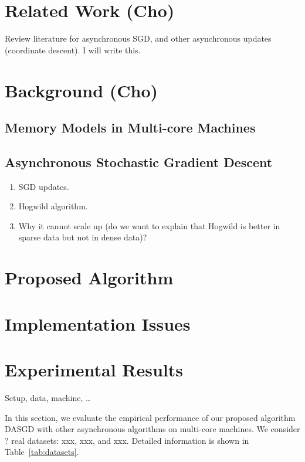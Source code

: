 \documentclass{sig-alternate-2013}
\newcommand{\0}{\boldsymbol{0}}
\def\DASGD{{DASGD}\xspace}
\begin{document}
\section{Related Work (Cho)}
\label{sec:related}
Review literature for asynchronous SGD, and other asynchronous updates (coordinate descent). 
I will write this. 

\section{Background (Cho)}
\label{sec:background}
\subsection{Memory Models in Multi-core Machines}

\subsection{Asynchronous Stochastic Gradient Descent}
\begin{enumerate}
  \item SGD updates. 
  \item Hogwild algorithm. 
  \item Why it cannot scale up (do we want to explain that Hogwild is better in sparse data but not in dense data)? 
\end{enumerate}

\section{Proposed Algorithm}
\label{sec:proposed}


\section{Implementation Issues}
\label{sec:implement}

\section{Experimental Results}
\label{sec:exp}

Setup, data, machine, \dots

In this section, we evaluate the empirical performance of our proposed
algorithm \DASGD with other asynchronous algorithms on multi-core machines.
We consider ? real datasets: xxx, xxx, and xxx. Detailed information is shown in Table~\ref{tab:datasets}. 
\end{document}

